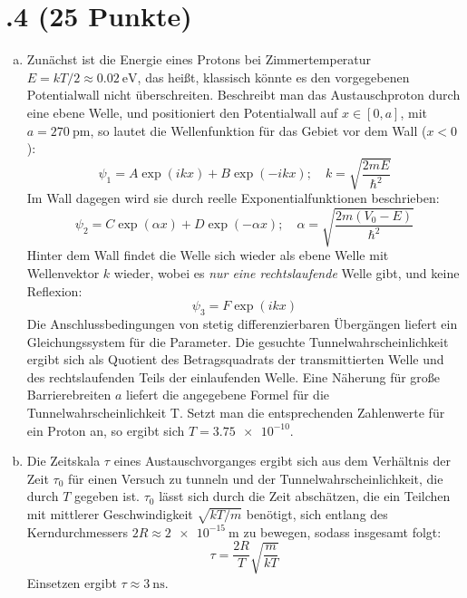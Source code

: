 \section*{\nr.4 \titfour (25 Punkte)}
\begin{enumerate}[(a)]
\item Zunächst ist die Energie eines Protons bei Zimmertemperatur $E=kT/2\approx \SI{0.02}{\electronvolt}$, das heißt, klassisch könnte es den vorgegebenen Potentialwall nicht überschreiten. Beschreibt man das Austauschproton durch eine ebene Welle, und positioniert den Potentialwall auf $x\in [0,a]$, mit $a=\SI{270}{\pico\meter}$, so lautet die Wellenfunktion für das Gebiet vor dem Wall ($x<0$):
\begin{equation}
\psi_1=A \exp(ik x) + B\exp(-ik x); \quad k = \sqrt{\frac{2mE}{\hbar^2}}
\end{equation}
Im Wall dagegen wird sie durch reelle Exponentialfunktionen beschrieben:
\begin{equation}
\psi_2=C \exp(\alpha x) + D\exp(-\alpha x); \quad \alpha = \sqrt{\frac{2m(V_0-E)}{\hbar^2}}
\end{equation}
Hinter dem Wall findet die Welle sich wieder als ebene Welle mit Wellenvektor $k$ wieder, wobei es \emph{nur eine rechtslaufende} Welle gibt, und keine Reflexion: 
\begin{equation}
\psi_3=F \exp(ik x)
\end{equation}
Die Anschlussbedingungen von stetig differenzierbaren Übergängen liefert ein Gleichungssystem für die Parameter. Die gesuchte Tunnelwahrscheinlichkeit ergibt sich als Quotient des Betragsquadrats der transmittierten Welle und des rechtslaufenden Teils der einlaufenden Welle. Eine Näherung für große Barrierebreiten $a$ liefert die angegebene Formel für die Tunnelwahrscheinlichkeit T. Setzt man die entsprechenden Zahlenwerte für ein Proton an, so ergibt sich $T = \num{3.75e-10}$.

\item Die Zeitskala $\tau$ eines Austauschvorganges ergibt sich aus dem Verhältnis der Zeit $\tau_0$ für einen Versuch zu tunneln und der Tunnelwahrscheinlichkeit, die durch $T$ gegeben ist. $\tau_0$ lässt sich durch die Zeit abschätzen, die ein Teilchen mit mittlerer Geschwindigkeit $\sqrt{kT/m}$ benötigt, sich entlang des Kerndurchmessers $2R \approx \SI{2e-15}{\meter}$ zu bewegen, sodass insgesamt folgt:
\begin{equation}
\tau = \frac{2R}{T} \sqrt{\frac{m}{kT}}
\end{equation}
Einsetzen ergibt $\tau \approx \SI{3}{\nano\second}$.


\end{enumerate}
